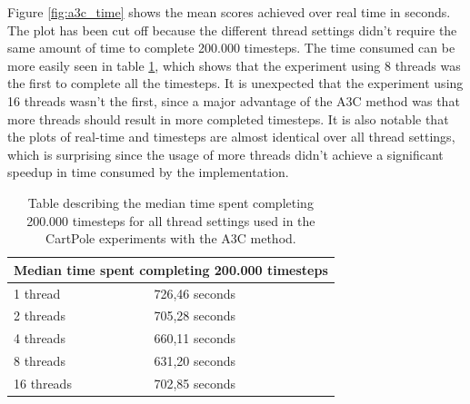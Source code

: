 \documentclass[11pt]{article}
\begin{document}
Figure \ref{fig:a3c_time} shows the mean scores achieved over real time in seconds.
The plot has been cut off because the different thread settings didn't require the
same amount of time to complete 200.000 timesteps.
The time consumed can be more easily seen in table \ref{tab:time}, which shows that
the experiment using 8 threads was the first to complete all the timesteps.
It is unexpected that the experiment using 16 threads wasn't the first,
since a major advantage of the A3C method was that more threads should
result in more completed timesteps.
It is also notable that the plots of real-time and timesteps are almost identical
over all thread settings, which is surprising since the usage of more
threads didn't achieve a significant speedup
in time consumed by the implementation.
\begin{table}[H]
    \centering
 \begin{tabular}{ |l|l| }
  \hline
  \multicolumn{2}{|c|}{Median time spent completing 200.000 timesteps} \\
  \hline
  1 thread & 726,46 seconds \\
  2 threads & 705,28 seconds \\
  4 threads & 660,11 seconds \\
  8 threads & 631,20 seconds \\
  16 threads & 702,85 seconds \\
  \hline
 \end{tabular}
 \caption{Table describing the median time spent completing 200.000 timesteps
 for all thread settings used in the CartPole experiments with the A3C method.}
    \label{tab:time}
\end{table}
\end{document}
